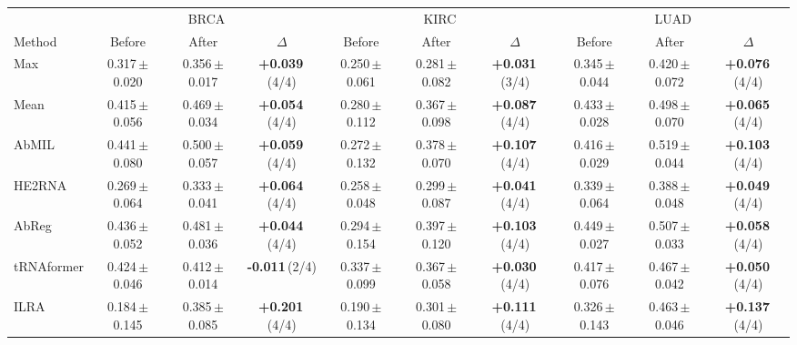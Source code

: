 \begin{tabular}{lccccccccc}
\toprule
& \multicolumn{3}{c}{BRCA} & \multicolumn{3}{c}{KIRC} & \multicolumn{3}{c}{LUAD}\\
\cmidrule(lr){2-4}\cmidrule(lr){5-7}\cmidrule(lr){8-10}
Method & Before & After & $\Delta$ & Before & After & $\Delta$ & Before & After & $\Delta$\\
\midrule
Max & 0.317\,{\tiny$\pm$0.020} & 0.356\,{\tiny$\pm$0.017} & \textbf{+0.039}\,{\tiny(4/4)} & 0.250\,{\tiny$\pm$0.061} & 0.281\,{\tiny$\pm$0.082} & \textbf{+0.031}\,{\tiny(3/4)} & 0.345\,{\tiny$\pm$0.044} & 0.420\,{\tiny$\pm$0.072} & \textbf{+0.076}\,{\tiny(4/4)}\\
Mean & 0.415\,{\tiny$\pm$0.056} & 0.469\,{\tiny$\pm$0.034} & \textbf{+0.054}\,{\tiny(4/4)} & 0.280\,{\tiny$\pm$0.112} & 0.367\,{\tiny$\pm$0.098} & \textbf{+0.087}\,{\tiny(4/4)} & 0.433\,{\tiny$\pm$0.028} & 0.498\,{\tiny$\pm$0.070} & \textbf{+0.065}\,{\tiny(4/4)}\\
AbMIL & 0.441\,{\tiny$\pm$0.080} & 0.500\,{\tiny$\pm$0.057} & \textbf{+0.059}\,{\tiny(4/4)} & 0.272\,{\tiny$\pm$0.132} & 0.378\,{\tiny$\pm$0.070} & \textbf{+0.107}\,{\tiny(4/4)} & 0.416\,{\tiny$\pm$0.029} & 0.519\,{\tiny$\pm$0.044} & \textbf{+0.103}\,{\tiny(4/4)}\\
HE2RNA & 0.269\,{\tiny$\pm$0.064} & 0.333\,{\tiny$\pm$0.041} & \textbf{+0.064}\,{\tiny(4/4)} & 0.258\,{\tiny$\pm$0.048} & 0.299\,{\tiny$\pm$0.087} & \textbf{+0.041}\,{\tiny(4/4)} & 0.339\,{\tiny$\pm$0.064} & 0.388\,{\tiny$\pm$0.048} & \textbf{+0.049}\,{\tiny(4/4)}\\
AbReg & 0.436\,{\tiny$\pm$0.052} & 0.481\,{\tiny$\pm$0.036} & \textbf{+0.044}\,{\tiny(4/4)} & 0.294\,{\tiny$\pm$0.154} & 0.397\,{\tiny$\pm$0.120} & \textbf{+0.103}\,{\tiny(4/4)} & 0.449\,{\tiny$\pm$0.027} & 0.507\,{\tiny$\pm$0.033} & \textbf{+0.058}\,{\tiny(4/4)}\\
tRNAformer & 0.424\,{\tiny$\pm$0.046} & 0.412\,{\tiny$\pm$0.014} & \textbf{-0.011}\,{\tiny(2/4)} & 0.337\,{\tiny$\pm$0.099} & 0.367\,{\tiny$\pm$0.058} & \textbf{+0.030}\,{\tiny(4/4)} & 0.417\,{\tiny$\pm$0.076} & 0.467\,{\tiny$\pm$0.042} & \textbf{+0.050}\,{\tiny(4/4)}\\
ILRA & 0.184\,{\tiny$\pm$0.145} & 0.385\,{\tiny$\pm$0.085} & \textbf{+0.201}\,{\tiny(4/4)} & 0.190\,{\tiny$\pm$0.134} & 0.301\,{\tiny$\pm$0.080} & \textbf{+0.111}\,{\tiny(4/4)} & 0.326\,{\tiny$\pm$0.143} & 0.463\,{\tiny$\pm$0.046} & \textbf{+0.137}\,{\tiny(4/4)}\\

\end{tabular}
